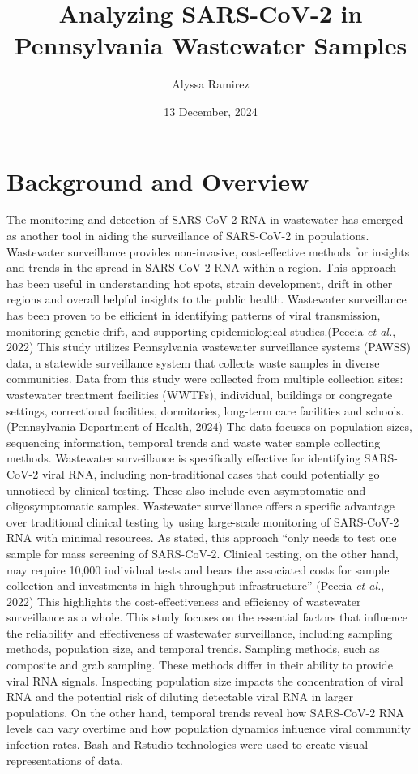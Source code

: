 \documentclass[
]{article}
\title{Analyzing SARS-CoV-2 in Pennsylvania Wastewater Samples}
\author{Alyssa Ramirez}
\date{13 December, 2024}
\begin{document}
\maketitle

\hypertarget{background-and-overview}{%
\section{Background and Overview}\label{background-and-overview}}

The monitoring and detection of SARS-CoV-2 RNA in wastewater has emerged
as another tool in aiding the surveillance of SARS-CoV-2 in populations.
Wastewater surveillance provides non-invasive, cost-effective methods
for insights and trends in the spread in SARS-CoV-2 RNA within a region.
This approach has been useful in understanding hot spots, strain
development, drift in other regions and overall helpful insights to the
public health. Wastewater surveillance has been proven to be efficient
in identifying patterns of viral transmission, monitoring genetic drift,
and supporting epidemiological studies.(Peccia \emph{et al.}, 2022) This
study utilizes Pennsylvania wastewater surveillance systems (PAWSS)
data, a statewide surveillance system that collects waste samples in
diverse communities. Data from this study were collected from multiple
collection sites: wastewater treatment facilities (WWTFs), individual,
buildings or congregate settings, correctional facilities, dormitories,
long-term care facilities and schools.(Pennsylvania Department of
Health, 2024) The data focuses on population sizes, sequencing
information, temporal trends and waste water sample collecting methods.
Wastewater surveillance is specifically effective for identifying
SARS-CoV-2 viral RNA, including non-traditional cases that could
potentially go unnoticed by clinical testing. These also include even
asymptomatic and oligosymptomatic samples. Wastewater surveillance
offers a specific advantage over traditional clinical testing by using
large-scale monitoring of SARS-CoV-2 RNA with minimal resources. As
stated, this approach ``only needs to test one sample for mass screening
of SARS-CoV-2. Clinical testing, on the other hand, may require 10,000
individual tests and bears the associated costs for sample collection
and investments in high-throughput infrastructure'' (Peccia \emph{et
al.}, 2022) This highlights the cost-effectiveness and efficiency of
wastewater surveillance as a whole. This study focuses on the essential
factors that influence the reliability and effectiveness of wastewater
surveillance, including sampling methods, population size, and temporal
trends. Sampling methods, such as composite and grab sampling. These
methods differ in their ability to provide viral RNA signals. Inspecting
population size impacts the concentration of viral RNA and the potential
risk of diluting detectable viral RNA in larger populations. On the
other hand, temporal trends reveal how SARS-CoV-2 RNA levels can vary
overtime and how population dynamics influence viral community infection
rates. Bash and Rstudio technologies were used to create visual
representations of data.
\end{document}
